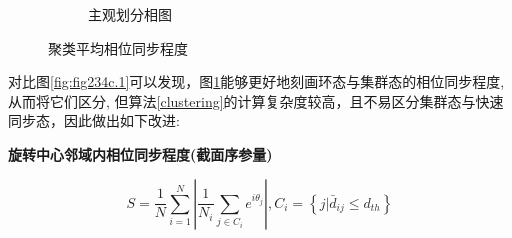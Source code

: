 \documentclass{article}
\begin{document}
\begin{figure}[H]
\begin{subfigure}[b]{0.49\textwidth}
		\vspace{-1cm}
		\caption{主观划分相图}
	\end{subfigure}
	\vspace{-0.5cm}
	\caption{聚类平均相位同步程度}
	\label{fig:fig234c.5}
\end{figure}

\vspace{-0.5cm}
对比图\ref{fig:fig234c.1}可以发现，图\ref{fig:fig234c.5}能够更好地刻画环态与集群态的相位同步程度, 从而将它们区分, 但算法\ref{clustering}的计算复杂度较高，且不易区分集群态与快速同步态，因此做出如下改进:

\noindent\textbf{旋转中心邻域内相位同步程度(截面序参量)}

\vspace{-0.5cm}
$$
S=\frac{1}{N}\sum_{i=1}^N{\left| \frac{1}{N_i}\sum_{j\in C_i}{e^{i\theta _j}} \right|}, C_i=\left\{ j|\bar{d}_{ij}\le d_{th} \right\} 
$$
\end{document}
